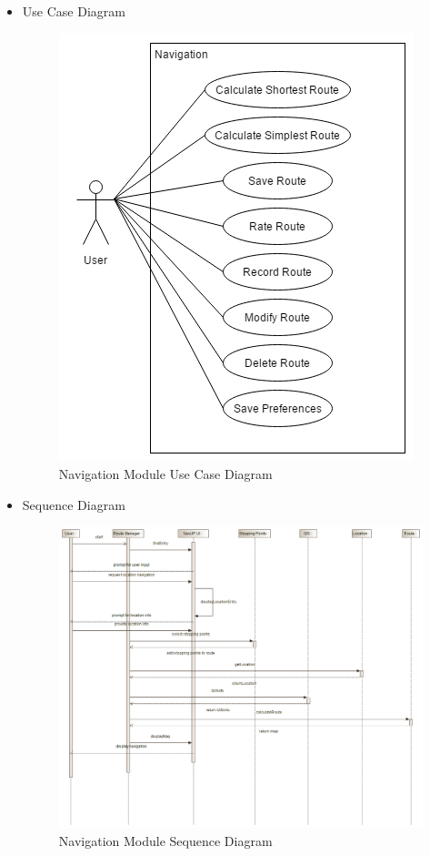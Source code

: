 \documentclass{article}
\begin{document}
\begin{itemize}
			\item Use Case Diagram
			\begin{center}
				\begin{figure}[!h]
					\includegraphics[scale=0.8]{Navigation_Use_Case_Diagram.png}
					\caption{Navigation Module Use Case Diagram}
				\end{figure}
			\end{center}
			\pagebreak
			
				\item Sequence Diagram
 				\begin{center}
 					\begin{figure}[!h]
 						\includegraphics[scale=0.45]{navigationSequenceDiagram.png}
 						\caption{Navigation Module Sequence Diagram}
 					\end{figure}
 				\end{center}
			\pagebreak		
			

\end{itemize}
\end{document}
